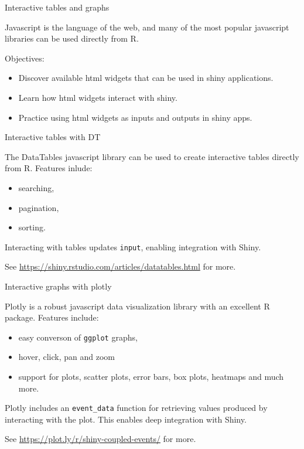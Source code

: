 \documentclass[
  12pt,
  ignorenonframetext,
]{beamer}
\providecommand{\tightlist}{%
  \setlength{\itemsep}{0pt}\setlength{\parskip}{0pt}}
\begin{document}
\begin{frame}{Interactive tables and graphs}

Javascript is the language of the web, and many of the most popular
javascript libraries can be used directly from R.

Objectives:

\begin{itemize}
\item
  Discover available html widgets that can be used in shiny
  applications.
\item
  Learn how html widgets interact with shiny.
\item
  Practice using html widgets as inputs and outputs in shiny apps.
\end{itemize}

\end{frame}

\begin{frame}[fragile]{Interactive tables with DT}
\protect\hypertarget{interactive-tables-with-dt}{}

The DataTables javascript library can be used to create interactive
tables directly from R. Features inlude:

\begin{itemize}
\tightlist
\item
  searching,
\item
  pagination,
\item
  sorting.
\end{itemize}

Interacting with tables updates \texttt{input}, enabling integration
with Shiny.

See \url{https://shiny.rstudio.com/articles/datatables.html} for more.

\end{frame}

\begin{frame}[fragile]{Interactive graphs with plotly}
\protect\hypertarget{interactive-graphs-with-plotly}{}

Plotly is a robust javascript data visualization library with an
excellent R package. Features include:

\begin{itemize}
\tightlist
\item
  easy converson of \texttt{ggplot} graphs,
\item
  hover, click, pan and zoom
\item
  support for plots, scatter plots, error bars, box plots, heatmaps and
  much more.
\end{itemize}

Plotly includes an \texttt{event\_data} function for retrieving values
produced by interacting with the plot. This enables deep integration
with Shiny.

See \url{https://plot.ly/r/shiny-coupled-events/} for more.

\end{frame}
\end{document}
